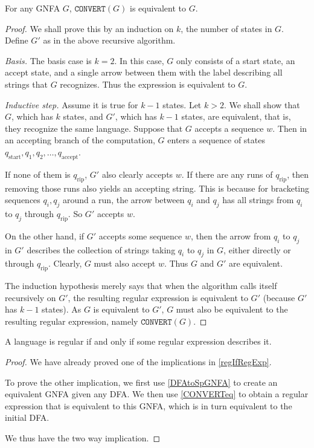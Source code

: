 \begin{lemma}
\label{CONVERTeq}
For any GNFA $G$, $\texttt{CONVERT}(G)$ is equivalent to $G$.
\end{lemma}
\begin{proof}
We shall prove this by an induction on $k$, the number of states in $G$. Define $G'$ as in the above recursive algorithm.

\vspace{2mm}
\textit{Basis.} The basis case is $k=2$. In this case, $G$ only consists of a start state, an accept state, and a single arrow between them with the label describing all strings that $G$ recognizes. Thus the expression is equivalent to $G$.

\vspace{2mm}
\textit{Inductive step.} Assume it is true for $k-1$ states. Let $k>2$. We shall show that $G$, which has $k$ states, and $G'$, which has $k-1$ states, are equivalent, that is, they recognize the same language. Suppose that $G$ accepts a sequence $w$. Then in an accepting branch of the computation, $G$ enters a sequence of states $q_{\text{start}},q_1,q_2,\ldots,q_{\text{accept}}$.

If none of them is $q_{\text{rip}}$, $G'$ also clearly accepts $w$. If there are any runs of $q_{\text{rip}}$, then removing those runs also yields an accepting string. This is because for bracketing sequences $q_i,q_j$ around a run, the arrow between $q_i$ and $q_j$ has all strings from $q_i$ to $q_j$ through $q_\text{rip}$. So $G'$ accepts $w$.

On the other hand, if $G'$ accepts some sequence $w$, then the arrow from $q_i$ to $q_j$ in $G'$ describes the collection of strings taking $q_i$ to $q_j$ in $G$, either directly or through $q_\text{rip}$. Clearly, $G$ must also accept $w$. Thus $G$ and $G'$ are equivalent.

\vspace{2mm}
The induction hypothesis merely says that when the algorithm calls itself recursively on $G'$, the resulting regular expression is equivalent to $G'$ (because $G'$ has $k-1$ states). As $G$ is equivalent to $G'$, $G$ must also be equivalent to the resulting regular expression, namely $\texttt{CONVERT}(G)$.
\end{proof}
\vspace{1mm}
\begin{theorem}
\label{regIffRegExp}
A language is regular if and only if some regular expression describes it.
\end{theorem}
\begin{proof}
We have already proved one of the implications in \ref{regIfRegExp}.

To prove the other implication, we first use \ref{DFAtoSpGNFA} to create an equivalent GNFA given any DFA. We then use \ref{CONVERTeq} to obtain a regular expression that is equivalent to this GNFA, which is in turn equivalent to the initial DFA.

\vspace{2mm}
We thus have the two way implication.
\end{proof}

